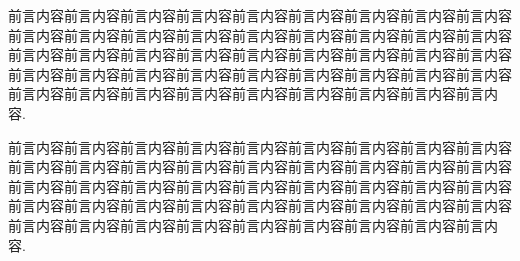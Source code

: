 

\begin{preface}

前言内容前言内容前言内容前言内容前言内容前言内容前言内容前言内容前言内容前言内容前言内容前言内容前言内容前言内容前言内容前言内容前言内容前言内容前言内容前言内容前言内容前言内容前言内容前言内容前言内容前言内容前言内容前言内容前言内容前言内容前言内容前言内容前言内容前言内容前言内容前言内容前言内容前言内容前言内容前言内容前言内容前言内容前言内容前言内容前言内容.

前言内容前言内容前言内容前言内容前言内容前言内容前言内容前言内容前言内容前言内容前言内容前言内容前言内容前言内容前言内容前言内容前言内容前言内容前言内容前言内容前言内容前言内容前言内容前言内容前言内容前言内容前言内容前言内容前言内容前言内容前言内容前言内容前言内容前言内容前言内容前言内容前言内容前言内容前言内容前言内容前言内容前言内容前言内容前言内容前言内容.


\end{preface}